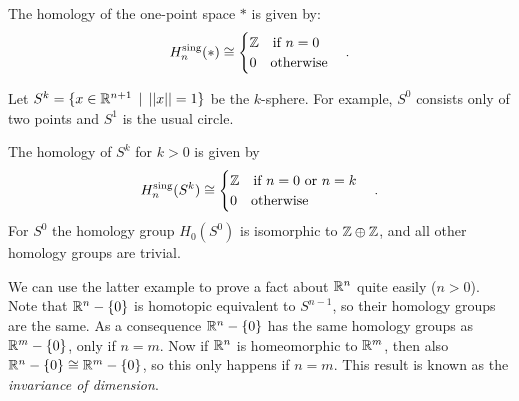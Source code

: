 \begin{example}
	The homology of the one-point space $\ast$ is given by:
	$$ H^\text{sing}_n(\ast) \cong
	\begin{cases}
		\mathbb{Z} \quad\text{if } n = 0 \\
		0  \quad\text{otherwise}
	\end{cases}. $$
\end{example}
Let $S^k = \{ x \in \mathbb{R}^{n+1} \,\mid\, ||x|| = 1 \}$ be the $k$-sphere. For example, $S^0$ consists only of two points and $S^1$ is the usual circle.
\begin{example}
	The homology of $S^k$ for $k>0$ is given by
	$$ H^\text{sing}_n(S^k) \cong
	\begin{cases}
		\mathbb{Z} \quad\text{if } n = 0 \text { or } n = k \\
		0  \quad\text{otherwise}
	\end{cases}. $$
	For $S^0$ the homology group $H_0(S^0)$ is isomorphic to $\mathbb{Z} \oplus \mathbb{Z}$, and all other homology groups are trivial.
\end{example}

We can use the latter example to prove a fact about $\mathbb{R}^n$ quite easily ($n > 0$). Note that $\mathbb{R}^n - \{0\}$ is homotopic equivalent to $S^{n-1}$, so their homology groups are the same. As a consequence $\mathbb{R}^n - \{0\}$ has the same homology groups as $\mathbb{R}^m - \{0\}$, only if $n=m$. Now if $\mathbb{R}^n$ is homeomorphic to $\mathbb{R}^m$, then also $\mathbb{R}^n - \{0\} \cong \mathbb{R}^m - \{0\}$, so this only happens if $n=m$. This result is known as the \emph{invariance of dimension}.
